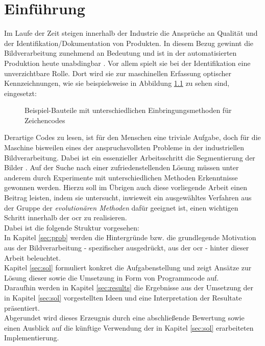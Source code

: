 \chapter{Einführung}
\label{sec:intro}
	
	Im Laufe der Zeit steigen innerhalb der Industrie die Ansprüche an Qualität und der Identifikation/Dokumentation von Produkten. In diesem Bezug gewinnt die Bildverarbeitung zunehmend an Bedeutung und ist in der automatisierten Produktion heute unabdingbar \cite[S. 1]{indust-imgproc}. 
	Vor allem spielt sie bei der Identifikation eine unverzichtbare Rolle. Dort wird sie zur maschinellen Erfassung optischer Kennzeichnungen, wie sie beispielsweise in Abbildung \ref{fig:example-code} zu sehen sind, eingesetzt:
	\begin{figure}[h]
		\centering
		\qquad
		\caption{Beispiel-Bauteile mit unterschiedlichen Einbringungsmethoden für Zeichencodes}
		\label{fig:example-code}
	\end{figure}
	Derartige Codes zu lesen, ist für den Menschen eine triviale Aufgabe, doch für die Maschine bisweilen eines der anspruchsvollsten Probleme in der industriellen Bildverarbeitung. Dabei ist ein essenzieller Arbeitsschritt die Segmentierung der Bilder \cite[S. 136]{indust-imgproc}. Auf der Suche nach einer zufriedenstellenden Lösung müssen unter anderem durch 
	Experimente mit unterschiedlichen Methoden Erkenntnisse gewonnen werden. 
	Hierzu soll im Übrigen auch diese vorliegende Arbeit einen Beitrag leisten, 
	indem sie untersucht, inwieweit ein ausgewähltes Verfahren aus der Gruppe 
	der \textit{evolutionären Methoden} dafür geeignet ist, einen wichtigen 
	Schritt innerhalb der \gls{ocr} zu realisieren. \\
	
	Dabei ist die folgende Struktur vorgesehen: \\
	In Kapitel \ref{sec:prob} werden die Hintergründe bzw. die grundlegende 
	Motivation aus der Bildverarbeitung - spezifischer ausgedrückt, aus der 
	\gls{ocr} - hinter dieser Arbeit beleuchtet.\\
	Kapitel \ref{sec:sol} formuliert konkret die Aufgabenstellung und zeigt Ansätze 
	zur Lösung dieser sowie die Umsetzung in Form von Programmcode auf.\\
	Daraufhin werden in Kapitel \ref{sec:results} die Ergebnisse aus der 
	Umsetzung der in Kapitel \ref{sec:sol} vorgestellten Ideen und eine 
	Interpretation der Resultate präsentiert.\\
	Abgerundet wird dieses Erzeugnis durch eine abschließende Bewertung sowie einen Ausblick auf die künftige Verwendung der in Kapitel \ref{sec:sol} erarbeiteten Implementierung.
